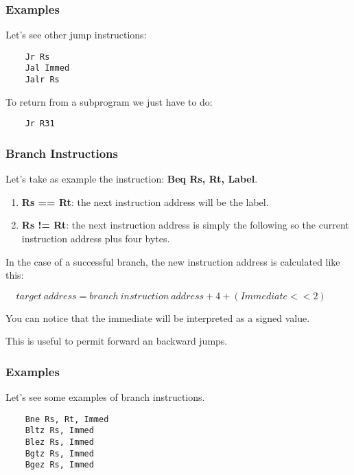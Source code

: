 
\begin{frame}[containsverbatim]
  \frametitle{Examples}

  Let's see other jump instructions:

  \begin{verbatim}
    Jr Rs
    Jal Immed
    Jalr Rs
  \end{verbatim}

  To return from a subprogram we just have to do:

  \begin{verbatim}
    Jr R31
  \end{verbatim}
\end{frame}


\begin{frame}
  \frametitle{Branch Instructions}

  Let's take as example the instruction: \textbf{Beq Rs, Rt, Label}.

  \begin{enumerate}
    \item
      \textbf{Rs == Rt}: the next instruction address will be the label.
    \item
      \textbf{Rs != Rt}: the next instruction address is simply the following
      so the current instruction address plus four bytes.
  \end{enumerate}

  \-

  In the case of a successful branch, the new instruction address is
  calculated like this:

  \-

  $~~~~~target~address = branch~instruction~address + 4 + (Immediate << 2)$

  \-

  You can notice that the immediate will be interpreted as a signed value.

  \-

  This is useful to permit forward an backward jumps.
\end{frame}


\begin{frame}[containsverbatim]
  \frametitle{Examples}

  Let's see some examples of branch instructions.

  \begin{verbatim}
    Bne Rs, Rt, Immed
    Bltz Rs, Immed
    Blez Rs, Immed
    Bgtz Rs, Immed
    Bgez Rs, Immed
  \end{verbatim}
\end{frame}


